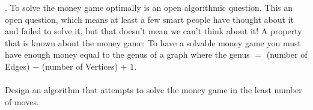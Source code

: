 \documentclass[12pt]{article}
\begin{document}
\newpage
{}. To solve the money game optimally is an open algorithmic question.
 This an open question, which means 
at least a few smart people have thought about it and failed to solve it, but that doesn't mean 
we can't think about it! A property that is known about the money game:
To have a solvable money game you must have enough money equal to the genus of a graph where 
the genus $=$ (number of Edges) $-$ (number of Vertices) $+$ $1$.\\\\
Design an algorithm that attempts to solve the money game in the least number of moves. 
\end{document}
